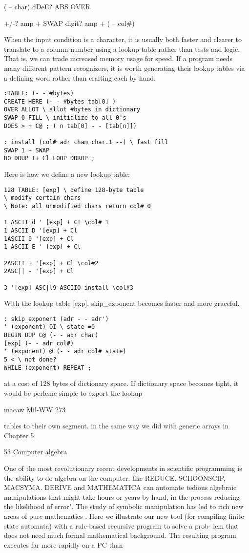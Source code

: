 ( -- char) dDeE? ABS OVER

+/-? amp + SWAP
digit? amp + ( -- col\#)


When the input condition is a character, it is usually both faster
and clearer to translate to a column number using a lookup table
rather than tests and logic. That is, we can trade increased
memory usage for speed. If a program needs many different
pattern recognizers, it is worth generating their lookup tables via
a defining word rather than crafting each by hand.
\begin{verbatim}
:TABLE: (- - #bytes)
CREATE HERE (- - #bytes tab[0] )
OVER ALLOT \ allot #bytes in dictionary
SWAP 0 FILL \ initialize to all 0's
DOES > + C@ ; ( n tab[0] - - [tab[n]])

: install (col# adr cham char.1 --) \ fast fill
SWAP 1 + SWAP
DO DDUP I+ Cl LOOP DDROP ;
\end{verbatim}
Here is how we define a new lookup table:
\begin{verbatim}
128 TABLE: [exp] \ define 128-byte table
\ modify certain chars
\ Note: all unmodified chars return col# 0

1 ASCII d ' [exp] + C! \col# 1
1 ASCII D '[exp] + Cl
1ASCII 9 '[exp] + Cl
1 ASCII E ' [exp] + Cl

2ASCII + '[exp] + Cl \col#2
2ASC|| - '[exp] + Cl

3 '[exp] ASC|l9 ASCIIO install \col#3
\end{verbatim}
With the lookup table [exp], skip\_exponent becomes faster
and more graceful,

\begin{verbatim}
: skip_exponent (adr - - adr')
' (exponent) OI \ state =0
BEGIN DUP C@ (- - adr char)
[exp] (- - adr col#)
' (exponent) @ (- - adr col# state)
5 < \ not done?
WHILE (exponent) REPEAT ;
\end{verbatim}

at a cost of 128 bytes of dictionary space. If dictionary space
becomes tight, it would be perfeme simple to export the lookup

macaw Mil-WW 273

tables to their own segment. in the same way we did with generic
arrays in Chapter 5.

53 Computer algebra

One of the most revolutionary recent developments in scientiﬁc
programming is the ability to do algebra on the computer.
like REDUCE. SCHOONSCIP, MACSYMA.
DERIVE and MATHEMATICA can automate tedious algebraic
manipulations that might take hours or years by hand, in the
process reducing the likelihood of error". The study of symbolic
manipulation has led to rich new areas of pure mathematics .
Here we illustrate our new tool (for compiling ﬁnite state
automata) with a rule-based recursive program to solve a prob-
lem that does not need much formal mathematical background.
The resulting program executes far more rapidly on a PC than

